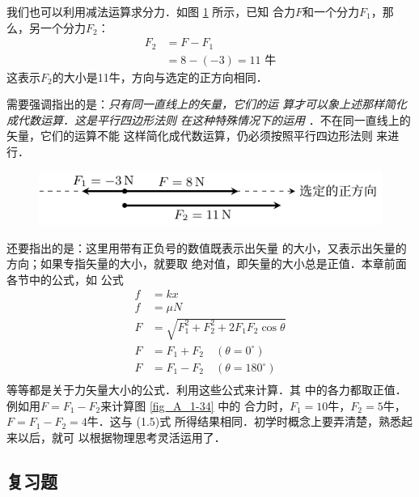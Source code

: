     我们也可以利用减法运算求分力．如图 \ref{fig_A_1-35} 所示，已知
合力$F$和一个分力$F_1$，那么，另一个分力$F_2$：
\begin{equation} 
\begin{split} 
F_2&=F-F_1\\
&=8-(-3)=11\text{ 牛} 
\end{split} 
\end{equation} 
这表示$F_2$的大小是11牛，方向与选定的正方向相同．

需要强调指出的是：\textit{只有同一直线上的矢量，它们的运
算才可以象上述那样简化成代数运算．这是平行四边形法则
在这种特殊情况下的运用} ．不在同一直线上的矢量，它们的运算不能
这样简化成代数运算，仍必须按照平行四边形法则
来进行．

\begin{figure} [htp]
\centering
\includegraphics{fig/A/1-35.pdf} 
\caption{} \label{fig_A_1-35} 
\end{figure} 

    还要指出的是：这里用带有正负号的数值既表示出矢量
的大小，又表示出矢量的方向；如果专指矢量的大小，就要取
绝对值，即矢量的大小总是正值．本章前面各节中的公式，如
公式
\[\begin{split} 
f&=kx\\
f&=\mu N\\
F&=\sqrt{F^2_1+F^2_2+2F_1F_2\cos\theta} \\
F&=F_1+F_2\quad (\theta =0^\circ)\\
F&=F_1-F_2\quad (\theta =180^\circ)\\
\end{split}  \]
等等都是关于力矢量大小的公式．利用这些公式来计算．其
中的各力都取正值．例如用$F=F_1-F_2$来计算图 \ref{fig_A_1-34} 中的
合力时，$F_1=10$牛，$F_2=5$牛，$F=F_1-F_2=4$牛．这与
(1.5)式
所得结果相同．初学时概念上要弄清楚，熟悉起来以后，就可
以根据物理思考灵活运用了．


\subsection*{复习题} 

